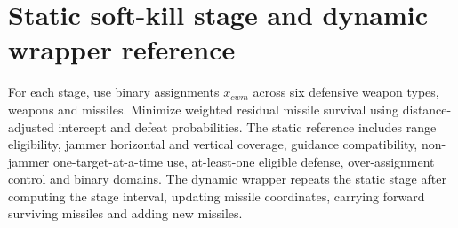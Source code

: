 \section*{Static soft-kill stage and dynamic wrapper reference}
For each stage, use binary assignments \(x_{cwm}\) across six defensive weapon types, weapons and missiles. Minimize weighted residual missile survival using distance-adjusted intercept and defeat probabilities. The static reference includes range eligibility, jammer horizontal and vertical coverage, guidance compatibility, non-jammer one-target-at-a-time use, at-least-one eligible defense, over-assignment control and binary domains. The dynamic wrapper repeats the static stage after computing the stage interval, updating missile coordinates, carrying forward surviving missiles and adding new missiles.

